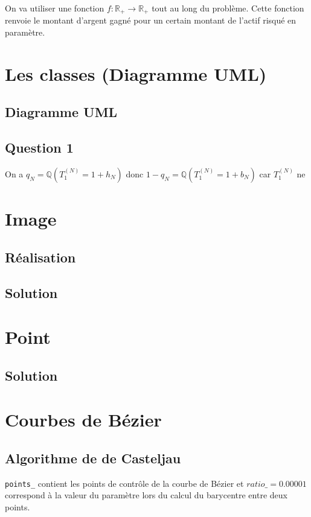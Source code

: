 \documentclass[a4paper, 12pt]{article}
\begin{document}
	On va utiliser une fonction $f:  \mathbb{R}_+ \rightarrow \mathbb{R}_+$ tout au long du problème. Cette fonction renvoie le montant d'argent gagné pour un certain montant de l'actif risqué en paramètre.\\
		
	\newpage

\section{Les classes (Diagramme UML)}			
\subsection{Diagramme UML}
\subsection{Question 1}
On a $q_N=\mathbb{Q}(T_1^{(N)}=1+h_N)$ donc $1-q_N=\mathbb{Q}(T_1^{(N)}=1+b_N)$ car $T_1^{(N)}$ ne 

\section{Image}	
\subsection{Réalisation}
\subsection{Solution}

\section{Point}	
\subsection{Solution}

\section{Courbes de Bézier}	
\subsection{Algorithme de de Casteljau}

\texttt{points\_} contient les points de contrôle de la courbe de Bézier et $ratio\_ = 0.00001$ correspond à la valeur du paramètre lors du calcul du barycentre entre deux points.
\end{document}
